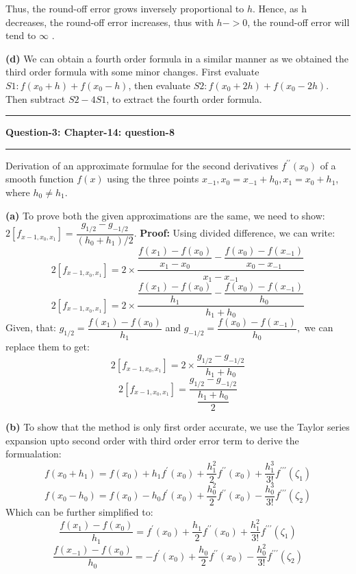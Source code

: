 \documentclass{article}
\newcommand\question[2]{\vspace{.25in}\hrule\textbf{#1: #2}\hrule\vspace{.10in}}
\renewcommand\part[1]{\vspace{.10in}\textbf{(#1)}}
\begin{document}
  Thus, the round-off error grows inversely proportional to $h$. Hence, as h decreases, the round-off error increases, thus with $h->0$, the round-off error will tend to $\infty$ .

  \part{d} We can obtain a fourth order formula in a similar manner as we obtained the third order formula with some minor changes. First evaluate $S1: f(x_0 + h) + f(x_0 - h)$, then evaluate $S2: f(x_0 + 2h) + f(x_0 - 2h)$. Then subtract $S2 - 4S1$, to extract the fourth order formula.

  \question{Question-3}{Chapter-14: question-8}
  Derivation of an approximate formulae for the second derivatives $f^{\prime\prime}(x_0)$ of a smooth function $f(x)$ using the three points $x_{-1},x_0 = x_{-1} + h_0, x_1=x_0 + h_1$, where $h_0 \neq h_1$. 

  \part{a} To prove both the given approximations are the same, we need to show: $2[f_{x-1,x_0,x_1}] = \dfrac{g_{1/2} - g_{-1/2}}{(h_0+h_1)/2}$. \newline
  \textbf {Proof:} \newline
  Using divided difference, we can write:
  \[2[f_{x-1,x_0,x_1}] = 2 \times \dfrac{\dfrac{f(x_1)-f(x_0)}{x_1 - x_0}-\dfrac{f(x_0) - f(x_{-1})}{x_0 - x_{-1}}}{x_1 - x_{-1}}\]
  \[2[f_{x-1,x_0,x_1}] = 2 \times \dfrac{\dfrac{f(x_1)-f(x_0)}{h_1}-\dfrac{f(x_0) - f(x_{-1})}{h_0}}{h_1 + h_0}\]
  Given, that: $g_{1/2} = \dfrac{f(x_1)-f(x_0)}{h_1}$ and $g_{-1/2} = \dfrac{f(x_0) - f(x_{-1})}{h_0},$ we can replace them to get:
  \[2[f_{x-1,x_0,x_1}] = 2 \times \dfrac{g_{1/2}-g_{-1/2}}{h_1 + h_0}\]
  \[2[f_{x-1,x_0,x_1}] = \dfrac{g_{1/2}-g_{-1/2}}{\dfrac{h_1 + h_0}{2}}\]

  \part{b} To show that the method is only first order accurate, we use the Taylor series expansion upto second order with third order error term to derive the formualation:\newline
  \[f(x_0 + h_1) = f(x_0) + h_1f^\prime(x_0) + \dfrac{h_1^2}{2}f^{\prime\prime}(x_0) + \dfrac{h_1^3}{3!}f^{\prime\prime\prime}(\zeta_1)\]
  \[f(x_0 - h_0) = f(x_0) - h_0f^\prime(x_0) + \dfrac{h_0^2}{2}f^{\prime\prime}(x_0) - \dfrac{h_0^3}{3!}f^{\prime\prime\prime}(\zeta_2)\]
  Which can be further simplified to:
  \[\dfrac{f(x_1) - f(x_0)}{h_1} =  f^\prime(x_0) + \dfrac{h_1}{2}f^{\prime\prime}(x_0) + \dfrac{h_1^2}{3!}f^{\prime\prime\prime}(\zeta_1)\]
  \[\dfrac{f(x_{-1}) - f(x_0)}{h_0} = -f^\prime(x_0) + \dfrac{h_0}{2}f^{\prime\prime}(x_0) - \dfrac{h_0^2}{3!}f^{\prime\prime\prime}(\zeta_2)\]
\end{document}
